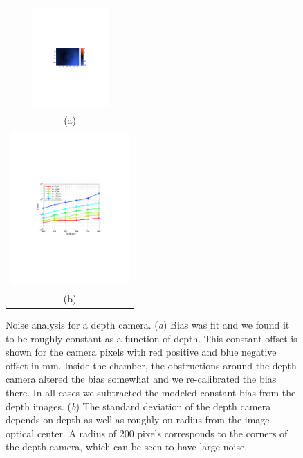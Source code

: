 \begin{figure}[t!]
\centering
\begin{tabular}{ c}
  \includegraphics[height=3.8cm,trim=175 310 140 310,clip]{Figures/BiasError} \\
   \small{(a)} \\
  \includegraphics[height=5.9cm,trim=110 250 60 260,clip]{Figures/SigmaRadius} \\
  \small{(b)}  \\
\end{tabular}
\caption{Noise analysis for a depth camera.  (\emph{a}) Bias was fit and we found it to be roughly constant as a function of depth.  This constant offset is shown for the camera pixels with red positive and blue negative offset in mm.  Inside the chamber, the obstructions around the depth camera altered the bias somewhat and we re-calibrated the bias there.  In all cases we subtracted the modeled constant bias from the depth images.  (\emph{b}) The standard deviation of the depth camera depends on depth as well as roughly on radius from the image optical center.  A radius of $200$ pixels corresponds to the corners of the depth camera, which can be seen to have large noise. }
\label{fig:Bias}
\end{figure}

